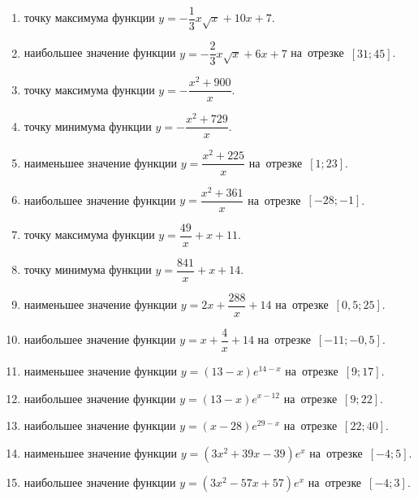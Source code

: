 \documentclass[a4paper,10pt]{article}
\begin{document}
\begin{enumerate}
\item {} точку максимума функции $y=-\dfrac{1}{3}x\sqrt{x} +10x+7$.

\item {} наибольшее значение функции $y=-\dfrac{2}{3}x\sqrt{x} +6x+7$ на~отрезке~$\left[31;45\right]$.

\item {} точку максимума функции $y=-\dfrac{x^2 +900}{x}$.

\item {} точку минимума функции $y=-\dfrac{x^2 +729}{x}$.

\item {} наименьшее значение функции $y=\dfrac{x^2 +225}{x}$ на~отрезке~$\left[1;23\right]$.

\item {} наибольшее значение функции $y=\dfrac{x^2 +361}{x}$ на~отрезке~$\left[-28;-1\right]$.

\item {} точку максимума функции $y=\dfrac{49}{x} +x+11$.

\item {} точку минимума функции $y=\dfrac{841}{x} +x+14$.

\item {} наименьшее значение функции $y=2x+\dfrac{288}{x} +14$ на~отрезке~$\left[0,5;25\right]$.

\item {} наибольшее значение функции $y=x+\dfrac{4}{x} +14$ на~отрезке~$\left[-11;-0,5\right]$.

\item {} наименьшее значение функции $y=\left(13-x\right)e^{14-x}$ на~отрезке~$\left[9;17\right]$.

\item {} наибольшее значение функции $y=\left(13-x\right)e^{x-12}$ на~отрезке~$\left[9;22\right]$.

\item {} наибольшее значение функции $y=\left(x-28\right)e^{29-x}$ на~отрезке~$\left[22;40\right]$.

\item {} наименьшее значение функции $y=\left(3x^2 +39x -39\right)e^{x }$ на~отрезке~$\left[-4;5\right]$.

\item {} наибольшее значение функции $y=\left(3x^2 -57x +57\right)e^{x}$ на~отрезке~$\left[-4;3\right]$.


\end{enumerate}
\end{document}
